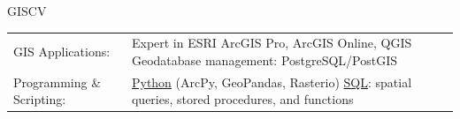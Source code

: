 \documentclass[letterpaper]{article}
\newenvironment{skillslist}
        {
            \hspace*{-0.07in}\begin{tabular}[t]{ l L{5.17in} }
        }{
            \end{tabular}
        }
\newcommand{\impt}[1]{\uline{#1}}
\begin{document}
    \begin{taggedblock}{GISCV}
        \begin{skillslist}
            GIS Applications:&
                Expert in ESRI ArcGIS Pro, ArcGIS Online, QGIS \linebreak
                Geodatabase management: PostgreSQL/PostGIS \linebreak
                \\
            Programming \& Scripting:&
                \impt{Python} (ArcPy, GeoPandas, Rasterio) \linebreak
                \impt{SQL}: spatial queries, stored procedures, and functions \linebreak

\end{skillslist}
\end{taggedblock}
\end{document}
